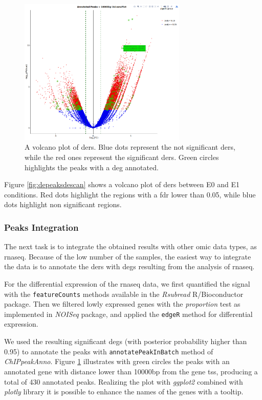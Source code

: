 \begin{figure}[H]
\centering
\includegraphics[width=8cm, keepaspectratio]{img/descan2/Annotated_depeaks_degenes.png}
\caption[Annotated Differential Enrichment Regions Volcano]{A volcano plot of \glspl{der}. Blue dots represent the not significant \glspl{der}, while the red ones represent the significant \glspl{der}. Green circles highlights the peaks with a \gls{deg} annotated.}
\label{fig:depeakdegenessdescan}

\end{figure}

Figure \ref{fig:depeaksdescan} shows a volcano plot of \glspl{der} between E0 and E1 conditions.
Red dots highlight the regions with a \gls{fdr}\cite{Benjamini1995} lower than 0.05, while blue dots highlight non significant regions.

\subsubsection{Peaks Integration}

The next task is to integrate the obtained results with other omic data types, as \gls{rnaseq}. 
Because of the low number of the samples, the easiest way to integrate the data is to annotate the \glspl{der} with \glspl{deg} resulting from the analysis of \gls{rnaseq}.

For the differential expression of the \gls{rnaseq} data, we first quantified the signal with the \lstinline!featureCounts! methods available in the \textit{Rsubread} \cite{Liao2013} R/Bioconductor package.
Then we filtered lowly expressed genes with the \textit{proportion} test as implemented in \textit{NOISeq} package, and applied the \lstinline!edgeR! method for differential expression.

We used the resulting significant \glspl{deg} (with posterior probability higher than 0.95) to annotate the peaks with \lstinline!annotatePeakInBatch! method of \textit{ChIPpeakAnno}.
Figure 	\ref{fig:depeakdegenessdescan} illustrates with green circles the peaks with an annotated gene with distance lower than 10000bp from the gene \gls{tss}, producing a total of 430 annotated peaks.
Realizing the plot with \textit{ggplot2} combined with \textit{plotly} library it is possible to enhance the names of the genes with a tooltip.

